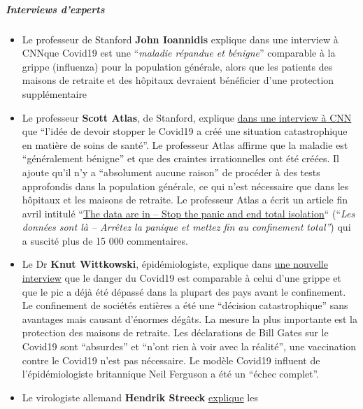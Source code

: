 \hypertarget{interviews-dexperts}{%
\subparagraph{\texorpdfstring{\textbf{Interviews
d'experts}}{Interviews d'experts}}\label{interviews-dexperts}}

\begin{itemize}
\tightlist
\item
  Le professeur de Stanford \textbf{John Ioannidis} explique dans une
  interview à CNNque Covid19 est une ``\emph{maladie répandue et
  bénigne}'' comparable à la grippe (influenza) pour la population
  générale, alors que les patients des maisons de retraite et des
  hôpitaux devraient bénéficier d'une protection supplémentaire
\item
  Le professeur \textbf{Scott Atlas}, de Stanford, explique
  \href{https://www.facebook.com/cnn/posts/10160799274796509}{dans une
  interview à CNN} que ``l'idée de devoir stopper le Covid19 a créé une
  situation catastrophique en matière de soins de santé''. Le professeur
  Atlas affirme que la maladie est ``généralement bénigne'' et que des
  craintes irrationnelles ont été créées. Il ajoute qu'il n'y a
  ``absolument aucune raison'' de procéder à des tests approfondis dans
  la population générale, ce qui n'est nécessaire que dans les hôpitaux
  et les maisons de retraite. Le professeur Atlas a écrit un article fin
  avril intitulé
  ``\href{https://thehill.com/opinion/healthcare/494034-the-data-are-in-stop-the-panic-and-end-the-total-isolation}{The
  data are in -- Stop the panic and end total isolation}`` (``\emph{Les
  données sont là -- Arrêtez la panique et mettez fin au confinement
  total''}) qui a suscité plus de 15 000 commentaires.
\item
  Le Dr \textbf{Knut Wittkowski}, épidémiologiste, explique dans
  \href{https://www.thepressandthepublic.com/post/perspectives-on-the-pandemic-v}{une
  nouvelle interview} que le danger du Covid19 est comparable à celui
  d'une grippe et que le pic a déjà été dépassé dans la plupart des pays
  avant le confinement. Le confinement de sociétés entières a été une
  ``décision catastrophique'' sans avantages mais causant d'énormes
  dégâts. La mesure la plus importante est la protection des maisons de
  retraite. Les déclarations de Bill Gates sur le Covid19 sont
  ``absurdes'' et ``n'ont rien à voir avec la réalité'', une vaccination
  contre le Covid19 n'est pas nécessaire. Le modèle Covid19 influent de
  l'épidémiologiste britannique Neil Ferguson a été un ``échec
  complet''.
\item
  Le virologiste allemand \textbf{Hendrik Streeck}
  \href{https://www.youtube.com/watch?v=vrL9QKGQrWk}{explique} les

\end{itemize}
